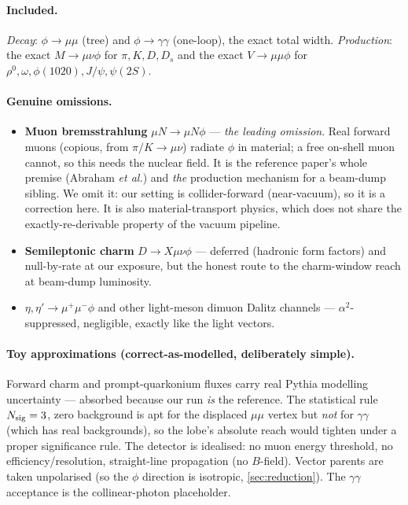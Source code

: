 \documentclass[11pt]{article}
\begin{document}
\paragraph{Included.} \emph{Decay}: $\phi\to\mu\mu$ (tree) and $\phi\to
\gamma\gamma$ (one-loop), the exact total width. \emph{Production}: the exact
$M\to\mu\nu\phi$ for $\pi,K,D,D_s$ and the exact $V\to\mu\mu\phi$ for
$\rho^0,\omega,\phi(1020),J/\psi,\psi(2S)$.

\paragraph{Genuine omissions.}
\begin{itemize}
\item \textbf{Muon bremsstrahlung} $\mu N\to\mu N\phi$ --- \emph{the leading
omission}. Real forward muons (copious, from $\pi/K\to\mu\nu$) radiate $\phi$ in
material; a free on-shell muon cannot, so this needs the nuclear field. It is the
reference paper's whole premise (Abraham \emph{et al.}) and \emph{the} production
mechanism for a beam-dump sibling. We omit it: our setting is collider-forward
(near-vacuum), so it is a correction here. It is also material-transport physics,
which does not share the exactly-re-derivable property of the vacuum pipeline.
\item \textbf{Semileptonic charm} $D\to X\mu\nu\phi$ --- deferred (hadronic form
factors) and null-by-rate at our exposure, but the honest route to the
charm-window reach at beam-dump luminosity.
\item \textbf{$\eta,\eta'\to\mu^+\mu^-\phi$} and other light-meson dimuon Dalitz
channels --- $\alpha^2$-suppressed, negligible, exactly like the light vectors.
\end{itemize}

\paragraph{Toy approximations (correct-as-modelled, deliberately simple).}
Forward charm and prompt-quarkonium fluxes carry real Pythia modelling
uncertainty --- absorbed because our run \emph{is} the reference. The statistical
rule $N_{\rm sig}=3$, zero background is apt for the displaced $\mu\mu$ vertex but
\emph{not} for $\gamma\gamma$ (which has real backgrounds), so the lobe's
absolute reach would tighten under a proper significance rule. The detector is
idealised: no muon energy threshold, no efficiency/resolution, straight-line
propagation (no $B$-field). Vector parents are taken unpolarised (so the $\phi$
direction is isotropic, \cref{sec:reduction}). The $\gamma\gamma$ acceptance is
the collinear-photon placeholder.
\end{document}
